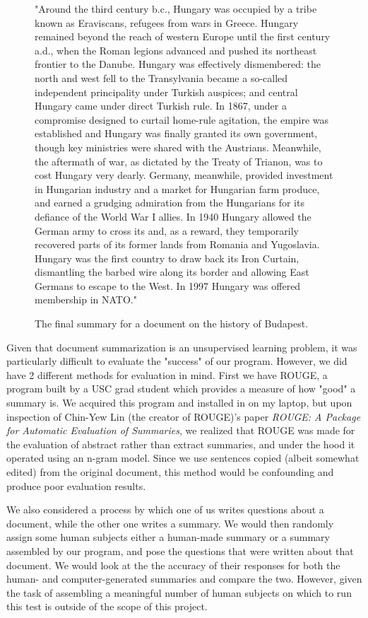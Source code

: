 \documentclass[12pt]{article}
\theoremstyle{plain}
\theoremstyle{definition}
\theoremstyle{remark}
\theoremstyle{plain}
\begin{document}
\begin{figure}
	
"Around the third century b.c., Hungary was occupied by a tribe known as Eraviscans, refugees from wars in Greece. Hungary remained beyond the reach of western Europe until the first century a.d., when the Roman legions advanced and pushed its northeast frontier to the Danube. Hungary was effectively dismembered: the north and west fell to the Transylvania became a so-called independent principality under Turkish auspices; and central Hungary came under direct Turkish rule. In 1867, under a compromise designed to curtail home-rule agitation, the empire was established and Hungary was finally granted its own government, though key ministries were shared with the Austrians. Meanwhile, the aftermath of war, as dictated by the Treaty of Trianon, was to cost Hungary very dearly. Germany, meanwhile, provided investment in Hungarian industry and a market for Hungarian farm produce, and earned a grudging admiration from the Hungarians for its defiance of the World War I allies. In 1940 Hungary allowed the German army to cross its and, as a reward, they temporarily recovered parts of its former lands from Romania and Yugoslavia. Hungary was the first country to draw back its Iron Curtain, dismantling the barbed wire along its border and allowing East Germans to escape to the West. In 1997 Hungary was offered membership in NATO."
\caption{The final summary for a document on the history of Budapest.}\label{goodsummary}
\end{figure}


 


	Given that document summarization is an unsupervised learning problem, it was particularly difficult to evaluate the "success" of our program. However, we did have 2 different methods for evaluation in mind. First we have ROUGE, a program built by a USC grad student which provides a measure of how "good" a summary is. We acquired this program and installed in on my laptop, but upon inspection of Chin-Yew Lin (the creator of ROUGE)'s paper \emph{ROUGE: A Package for Automatic Evaluation of Summaries}, we realized that ROUGE was made for the evaluation of abstract rather than extract summaries, and under the hood it operated using an n-gram model. Since we use sentences copied (albeit somewhat edited) from the original document, this method would be confounding and produce poor evaluation results.
	
We also considered a process by which one of us writes questions about a document, while the other one writes a summary. We would then randomly assign some human subjects either a human-made summary or a summary assembled by our program, and pose the questions that were written about that document. We would look at the the accuracy of their responses for both the human- and computer-generated summaries and compare the two. However, given the task of assembling a meaningful number of human subjects on which to run this test is outside of the scope of this project.
\end{document}
